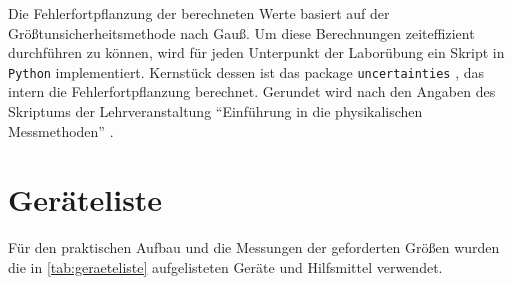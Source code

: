 \documentclass[ngerman]{scrartcl}
\begin{document}
Die Fehlerfortpflanzung der berechneten Werte basiert auf der Größtunsicherheitsmethode nach Gauß. Um diese Berechnungen zeiteffizient durchführen zu können, wird für jeden Unterpunkt der Laborübung ein Skript in \verb!Python! implementiert. Kernstück dessen ist das package \verb!uncertainties! \cite{ref:uncertainties}, das intern die Fehlerfortpflanzung berechnet. Gerundet wird nach den Angaben des Skriptums der Lehrveranstaltung \enquote{Einführung in die physikalischen Messmethoden} \cite{ref:messmethoden}.

\clearpage

\section{Geräteliste}
\label{sec:geraeteliste}

Für den praktischen Aufbau und die Messungen der geforderten Größen wurden die in \autoref{tab:geraeteliste} aufgelisteten Geräte und Hilfsmittel verwendet.
\end{document}
